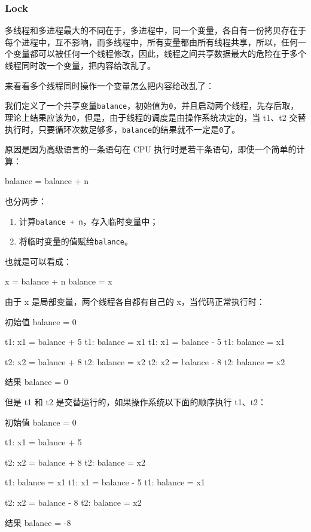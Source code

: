 \hypertarget{lock}{%
\subsubsection{Lock}\label{lock}}

多线程和多进程最大的不同在于，多进程中，同一个变量，各自有一份拷贝存在于每个进程中，互不影响，而多线程中，所有变量都由所有线程共享，所以，任何一个变量都可以被任何一个线程修改，因此，线程之间共享数据最大的危险在于多个线程同时改一个变量，把内容给改乱了。

来看看多个线程同时操作一个变量怎么把内容给改乱了：

我们定义了一个共享变量\texttt{balance}，初始值为\texttt{0}，并且启动两个线程，先存后取，理论上结果应该为\texttt{0}，但是，由于线程的调度是由操作系统决定的，当
t1、t2
交替执行时，只要循环次数足够多，\texttt{balance}的结果就不一定是\texttt{0}了。

原因是因为高级语言的一条语句在 CPU
执行时是若干条语句，即使一个简单的计算：

\begin{pythoncode}
balance = balance + n
\end{pythoncode}

也分两步：

\begin{enumerate}
\def\labelenumi{\arabic{enumi}.}
\item
  计算\texttt{balance\ +\ n}，存入临时变量中；
\item
  将临时变量的值赋给\texttt{balance}。
\end{enumerate}

也就是可以看成：

\begin{pythoncode}
x = balance + n
balance = x
\end{pythoncode}

由于 x 是局部变量，两个线程各自都有自己的 x，当代码正常执行时：

\begin{pythoncode}
初始值 balance = 0

t1: x1 = balance + 5 
t1: balance = x1     
t1: x1 = balance - 5 
t1: balance = x1     

t2: x2 = balance + 8 
t2: balance = x2     
t2: x2 = balance - 8 
t2: balance = x2     
    
结果 balance = 0
\end{pythoncode}

但是 t1 和 t2 是交替运行的，如果操作系统以下面的顺序执行 t1、t2：

\begin{pythoncode}
初始值 balance = 0

t1: x1 = balance + 5  

t2: x2 = balance + 8  
t2: balance = x2      

t1: balance = x1      
t1: x1 = balance - 5  
t1: balance = x1      

t2: x2 = balance - 8  
t2: balance = x2      

结果 balance = -8
\end{pythoncode}

